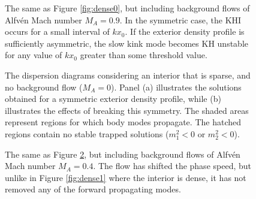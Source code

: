 \begin{figure}[t]
\centering
{}
\caption{The same as Figure \ref{fig:dense0}, but including background flows of Alfv\'en Mach number $M_A = 0.9$.
In the symmetric case, the KHI occurs for a small interval of $k x_0$.
If the exterior density profile is sufficiently asymmetric, the slow kink mode becomes KH unstable for any value of $k x_0$ greater than some threshold value.}
\label{fig:dense3}
\end{figure}

\begin{figure}[t]
\centering
{}
\caption{The dispersion diagrams considering an interior that is sparse, and no background flow ($M_A = 0$).
Panel (a) illustrates the solutions obtained for a symmetric exterior density profile, while (b) illustrates the effects of breaking this symmetry.
The shaded areas represent regions for which body modes propagate.
The hatched regions contain no stable trapped solutions ($m_1^2 < 0$ or $m_2^2 < 0$).}
\label{fig:evacuated0}
\end{figure}

\begin{figure}[t]
\centering
{}
\caption{The same as Figure \ref{fig:evacuated0}, but including background flows of Alfv\'en Mach number $M_A = 0.4$.
The flow has shifted the phase speed, but unlike in Figure \ref{fig:dense1} where the interior is dense, it has not removed any of the forward propagating modes.}
\label{fig:evacuated1}
\end{figure}

